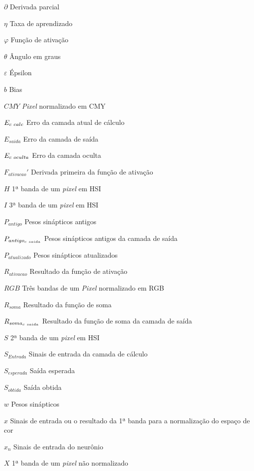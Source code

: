 \documentclass[12pt,oneside,a4paper,chapter=TITLE,section=TITLE,sumario
		=tradicional]{abntex2}
\begin{document}
		\begin{simbolos}
		  \item[$\partial$] Derivada parcial
		  \item[$\eta$] Taxa de aprendizado
		  \item[$\varphi$] Função de ativação
		  \item[$\theta$] Ângulo em graus
		  \item[$\varepsilon$] Épsilon
		  \item[$b$] Bias
		  \item[$CMY$] \textit{Pixel} normalizado em CMY
		  \item[$E_{c\hspace{0.1cm}calc}$] Erro da camada atual de cálculo
		  \item[$E_{saida}$] Erro da camada de saída
		  \item[$E_{c\hspace{0.1cm}oculta}$] Erro da camada oculta
		  \item[$F_{ativacao}'$] Derivada primeira da função de ativação
		  \item[$H$] 1ª banda de um \textit{pixel} em HSI
		  \item[$I$] 3ª banda de um \textit{pixel} em HSI
		  \item[$P_{antigo}$] Pesos sinápticos antigos
		  \item[$P_{antigo_{c\hspace{0.1cm}saida}}$] Pesos sinápticos antigos da camada de saída
		  \item[$P_{atualizado}$] Pesos sinápticos atualizados	  
		  \item[$R_{ativacao}$] Resultado da função de ativação
		  \item[$RGB$] Três bandas de um \textit{Pixel} normalizado em RGB 
		  \item[$R_{soma}$] Resultado da função de soma		  
		  \item[$R_{soma_{c\hspace{0.1cm}saida}}$] Resultado da função de soma da camada de saída
		  \item[$S$] 2ª banda de um \textit{pixel} em HSI	
		  \item[$S_{Entrada}$] Sinais de entrada da camada de cálculo
		  \item[$S_{esperada}$] Saída esperada
		  \item[$S_{obtida}$] Saída obtida
		  \item[$w$] Pesos sinápticos
		  \item[$x$] Sinais de entrada ou o resultado da 1ª banda para a normalização do espaço de cor		  
		  \item[$x_{n}$] Sinais de entrada do neurônio
		  \item[$X$] 1ª banda de um \textit{pixel} não normalizado


\end{simbolos}
\end{document}
